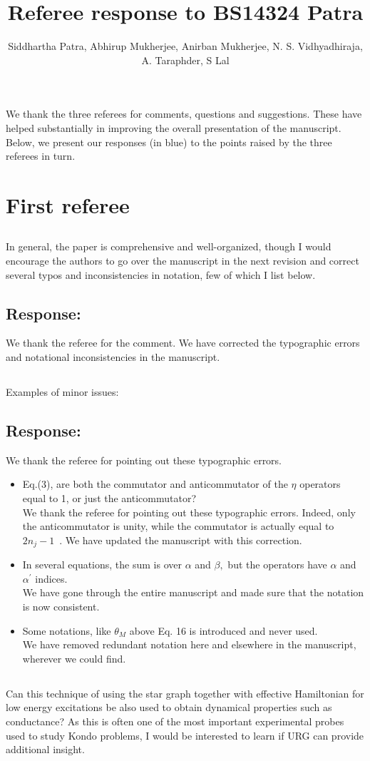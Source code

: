 \documentclass{article}
\author{Siddhartha Patra, Abhirup Mukherjee, Anirban Mukherjee, N. S. Vidhyadhiraja,\\ A. Taraphder, S Lal}
\title{Referee response to BS14324 Patra}
\newcommand{\response}[1]{{\color{blue}\subsection*{Response:}{#1}}}
\newcommand{\point}[1]{\subsection{}{#1}}
\begin{document}
\maketitle

We thank the three referees for comments, questions and suggestions. These have helped substantially in improving the overall presentation of the manuscript. Below, we present our responses (in blue) to the points raised by the three referees in turn.

\section{First referee}

\point{In general, the paper is comprehensive and well-organized, though I would encourage the authors to go over the manuscript in the next revision and correct several typos and inconsistencies in notation, few of which I list below.}
\response{We thank the referee for the comment. We have corrected the typographic errors and notational inconsistencies in the manuscript.} 

\point{
Examples of minor issues:
\response{ We thank the referee for pointing out these typographic errors.} 
\begin{itemize}
	\item Eq.(3), are both the commutator and anticommutator of the $\eta$
operators equal to 1, or just the anticommutator?\\
{\color{blue}{\bf Response:} We thank the referee for pointing out these typographic errors. Indeed, only the anticommutator is unity, while the commutator is actually equal to $2\hat n_j - 1$~\cite{anirbanurg1}. We have updated the manuscript with this correction.}
	\item In several equations, the sum is over $\alpha$ and $\beta,$ but the operators have $\alpha$ and $\alpha^\prime$ indices.\\
{\color{blue}{\bf Response:} We have gone through the entire manuscript and made sure that the notation is now consistent.}
	\item Some notations, like $\theta_M$ above Eq. 16 is introduced and never
	used.\\
{\color{blue}{\bf Response:} We have removed redundant notation here and elsewhere in the manuscript, wherever we could find.}
\end{itemize}
}

\point{
Can this technique of using the star graph together with effective Hamiltonian for low energy excitations be also used to obtain dynamical properties such as conductance? As this is often one of the most important experimental probes used to study Kondo problems, I would be interested to learn if URG can provide additional insight.}
\end{document}
